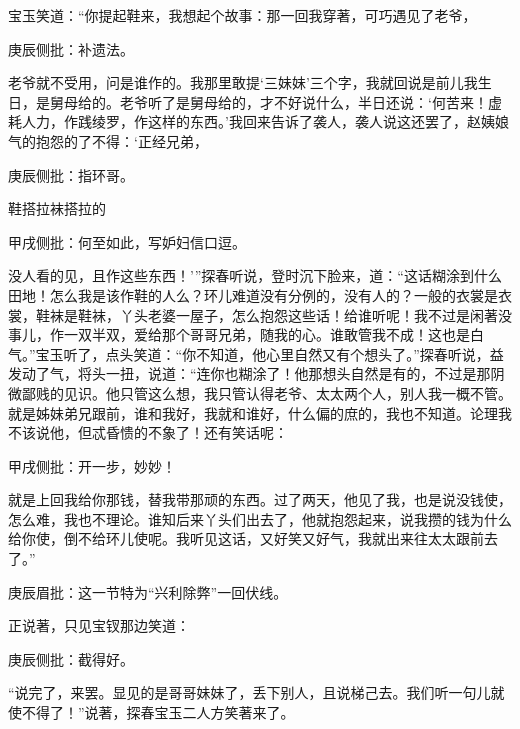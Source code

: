 \begin{parag}
    宝玉笑道：“你提起鞋来，我想起个故事：那一回我穿著，可巧遇见了老爷，\begin{note}庚辰侧批：补遗法。\end{note}老爷就不受用，问是谁作的。我那里敢提‘三妹妹’三个字，我就回说是前儿我生日，是舅母给的。老爷听了是舅母给的，才不好说什么，半日还说：‘何苦来！虚耗人力，作践绫罗，作这样的东西。’我回来告诉了袭人，袭人说这还罢了，赵姨娘气的抱怨的了不得：‘正经兄弟，\begin{note}庚辰侧批：指环哥。\end{note}鞋搭拉袜搭拉的\begin{note}甲戌侧批：何至如此，写妒妇信口逗。\end{note}没人看的见，且作这些东西！’”探春听说，登时沉下脸来，道：“这话糊涂到什么田地！怎么我是该作鞋的人么？环儿难道没有分例的，没有人的？一般的衣裳是衣裳，鞋袜是鞋袜，丫头老婆一屋子，怎么抱怨这些话！给谁听呢！我不过是闲著没事儿，作一双半双，爱给那个哥哥兄弟，随我的心。谁敢管我不成！这也是白气。”宝玉听了，点头笑道：“你不知道，他心里自然又有个想头了。”探春听说，益发动了气，将头一扭，说道：“连你也糊涂了！他那想头自然是有的，不过是那阴微鄙贱的见识。他只管这么想，我只管认得老爷、太太两个人，别人我一概不管。就是姊妹弟兄跟前，谁和我好，我就和谁好，什么偏的庶的，我也不知道。论理我不该说他，但忒昏愦的不象了！还有笑话呢：\begin{note}甲戌侧批：开一步，妙妙！\end{note}就是上回我给你那钱，替我带那顽的东西。过了两天，他见了我，也是说没钱使，怎么难，我也不理论。谁知后来丫头们出去了，他就抱怨起来，说我攒的钱为什么给你使，倒不给环儿使呢。我听见这话，又好笑又好气，我就出来往太太跟前去了。”\begin{note}庚辰眉批：这一节特为“兴利除弊”一回伏线。\end{note}正说著，只见宝钗那边笑道：\begin{note}庚辰侧批：截得好。\end{note}“说完了，来罢。显见的是哥哥妹妹了，丢下别人，且说梯己去。我们听一句儿就使不得了！”说著，探春宝玉二人方笑著来了。
\end{parag}


